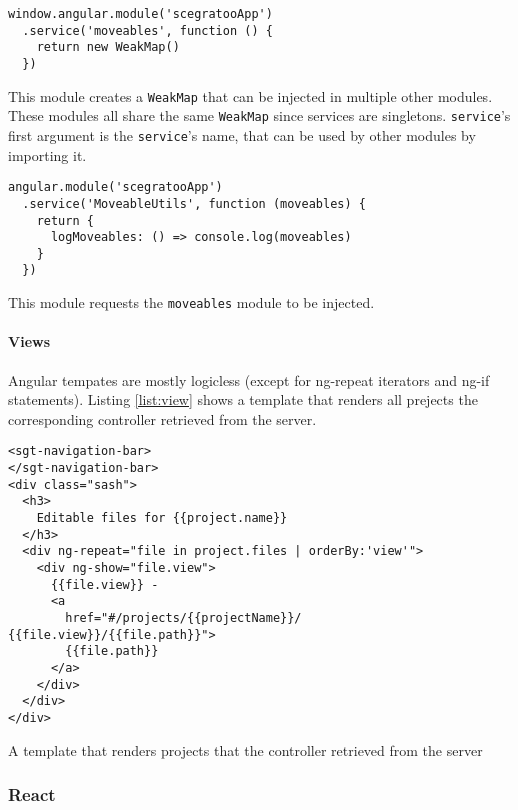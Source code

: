 \begin{listing}
  \begin{verbatim}
window.angular.module('scegratooApp')
  .service('moveables', function () {
    return new WeakMap()
  })
  \end{verbatim}
  \caption{This module creates a \texttt{WeakMap} that can be injected in multiple other modules. These modules all share the same \texttt{WeakMap} since services are singletons. \texttt{service}'s first argument is the \texttt{service}'s name, that can be used by other modules by importing it.}
  \label{list:angularmodule}
\end{listing}

\begin{listing}
  \begin{verbatim}
angular.module('scegratooApp')
  .service('MoveableUtils', function (moveables) {
    return {
      logMoveables: () => console.log(moveables)
    }
  })
  \end{verbatim}
  \caption{This module requests the \texttt{moveables} module to be injected.}
  \label{list:depinj}
\end{listing}

\paragraph{Views}
\label{par:Views}

Angular tempates are mostly logicless
(except for ng-repeat iterators and ng-if statements). Listing \ref{list:view}
shows a template that renders all prejects the corresponding controller
retrieved from the server.

\begin{listing}
  \begin{verbatim}
<sgt-navigation-bar>
</sgt-navigation-bar>
<div class="sash">
  <h3>
    Editable files for {{project.name}}
  </h3>
  <div ng-repeat="file in project.files | orderBy:'view'">
    <div ng-show="file.view">
      {{file.view}} -
      <a
        href="#/projects/{{projectName}}/ {{file.view}}/{{file.path}}">
        {{file.path}}
      </a>
    </div>
  </div>
</div>
  \end{verbatim}
  \caption{A template that renders projects that the controller retrieved from the server}
  \label{list:view}
\end{listing}

\subsubsection{React}
\label{react}

